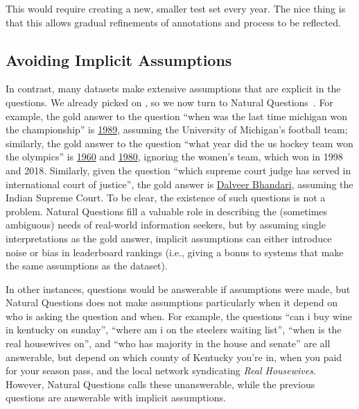 This would require creating a new, smaller test set every year.
The nice thing is that this allows gradual refinements of annotations
and process to be reflected.

\subsection{Avoiding Implicit Assumptions}

In contrast, many datasets make extensive assumptions that are explicit in the questions.
We already picked on \squad{}, so we now turn to Natural Questions~\cite{kwiatkowski-19}.
For example, the gold answer to the question ``when was the last time michigan won the championship'' is \underline{1989}, assuming the University of Michigan's football team; similarly, the gold answer to the question ``what year did the us hockey team won the olympics'' is \underline{1960} and \underline{1980}, ignoring the  women's team, which won in 1998 and 2018.
Similarly, given the question ``which supreme court judge has served in international court of justice'', the gold answer is \underline{Dalveer Bhandari}, assuming the Indian Supreme Court.
To be clear, the existence of such questions is not a problem.
Natural Questions fill a valuable role in describing the (sometimes ambiguous) needs of real-world information seekers, but by assuming single interpretations as the gold answer, implicit assumptions can either introduce noise or bias in leaderboard rankings (i.e., giving a bonus to systems that make the same assumptions as the dataset).


In other instances, questions would be answerable if assumptions were made, but Natural Questions does not make assumptions particularly when it depend on who is asking the question and when.
For example, the questions ``can i buy wine in kentucky on sunday'', ``where am i on the steelers waiting list'', ``when is the real housewives on'', and ``who has majority in the house and senate'' are all answerable, but depend on which county of Kentucky you're in,
  when you paid for your season pass, and the local network
  syndicating \textit{Real Housewives}.
However, Natural Questions calls these unanswerable, while the previous questions are answerable with implicit assumptions.

